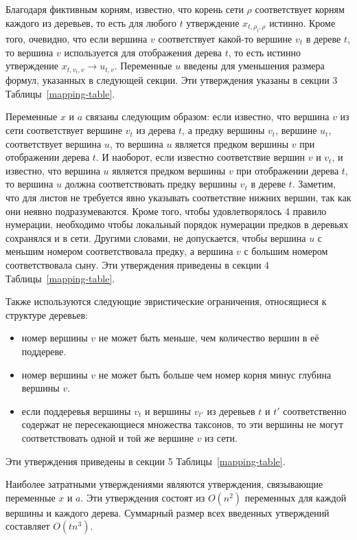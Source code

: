 Благодаря фиктивным корням, известно, что корень сети $\rho$ соответствует корням каждого из деревьев, то есть для любого $t$ утверждение $x_{t,\rho_t,\rho}$ истинно.
Кроме того, очевидно, что если вершина $v$ соответствует какой-то вершине $v_t$ в дереве $t$, то вершина $v$ используется для отображения дерева $t$, то есть истинно утверждение $x_{t,v_t,v} \rightarrow u_{t,v}$.
Переменные $u$ введены для уменьшения размера формул, указанных в следующей секции.
Эти утверждения указаны в секции 3 Таблицы~\ref{mapping-table}.

Переменные $x$ и $a$ связаны следующим образом: если известно, что вершина $v$ из сети соответствует вершине $v_t$ из дерева $t$, а предку вершины $v_t$, вершине $u_t$, соответствует вершина $u$, то вершина $u$ является предком вершины $v$ при отображении дерева $t$.
И наоборот, если известно соответствие вершин $v$ и $v_t$, и известно, что вершина $u$ является предком вершины $v$ при отображении дерева $t$, то вершина $u$ должна соответствовать предку вершины $v_t$ в дереве $t$.
Заметим, что для листов не требуется явно указывать соответствие нижних вершин, так как они неявно подразумеваются.
Кроме того, чтобы удовлетворялось 4 правило нумерации, необходимо чтобы локальный порядок нумерации предков в деревьях сохранялся и в сети.
Другими словами, не допускается, чтобы вершина $u$ с меньшим номером соответствовала предку, а вершина $v$ с большим номером соответствовала сыну.
Эти утверждения приведены в секции 4 Таблицы~\ref{mapping-table}.

Также используются следующие эвристические ограничения, относящиеся к структуре деревьев:

\begin{itemize}
	\item номер вершины $v$ не может быть меньше, чем количество вершин в её поддереве.
	\item номер вершины $v$ не может быть больше чем номер корня минус глубина вершины $v$.
	\item если поддеревья вершины $v_t$ и вершины $v_{t'}$ из деревьев $t$ и $t'$ соответственно содержат не пересекающиеся множества таксонов, то эти вершины не могут соответствовать одной и той же вершине $v$ из сети.
\end{itemize}

Эти утверждения приведены в секции 5 Таблицы~\ref{mapping-table}.

Наиболее затратными утверждениями являются утверждения, связывающие переменные $x$ и $a$.
Эти утверждения состоят из $O(n^2)$ переменных для каждой вершины и каждого дерева.
Суммарный размер всех введенных утверждений составляет $O(tn^3)$.

